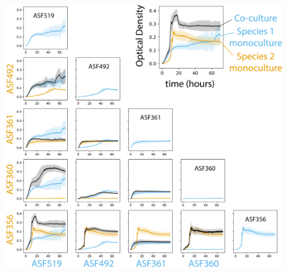 \documentclass[11pt,twocolumn,notitlepage,openany,twoside]{book}
\begin{document}
\begin{refsection}
\begin{suppfigure*}
\centering
\includegraphics[width=0.9\textwidth]{ch2_figS2}
\caption[Optical density-based growth curves for \textit{Clostridium} ASF356, \textit{Lactobacillus} ASF360, \textit{Lactobacillus} ASF361, \textit{Eubacterium} ASF492, and \textit{Parabacteroides} ASF519.]{\textbf{Optical density-based growth curves for \textit{Clostridium} ASF356, \textit{Lactobacillus} ASF360, \textit{Lactobacillus} ASF361, \textit{Eubacterium} ASF492, and \textit{Parabacteroides} ASF519.} Optical density was measured at 589nm. Experiments were performed in 96 well plates with 200{\textmu}L total volume in each well. Each sample group (monocultures and co-cultures) contains 8 biological replicates from a single experiment (e.g. each replicate was grown in an independent well, but they were derived from the same starter culture). Line shows the mean for each sample group, and shading extends one standard deviation from the mean in both the positive and negative direction. Sky blue line indicates monoculture for the strain labelled in sky blue along the x axis. Orange line indicates monoculture for the strain labelled in orange along the y axis. Black line indicates co-culture of the two strains. Diagonal shows the monoculture growth curve for each species. Axes units are identical on all subplots. Time is shown in hours, extending to 72 hours.}
\end{suppfigure*}

\end{refsection}
\end{document}
